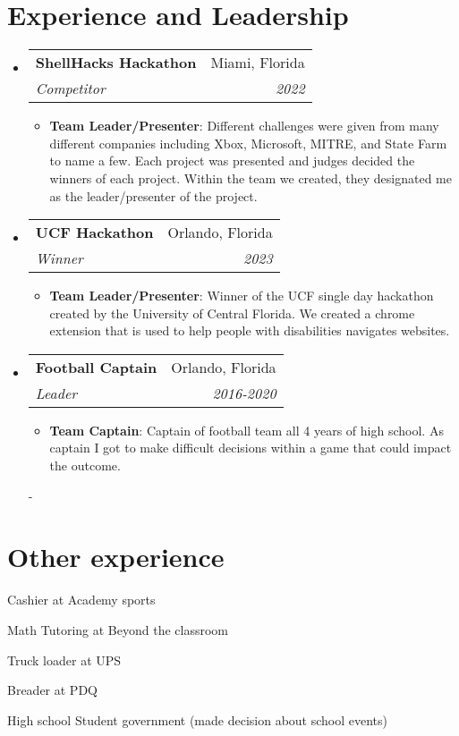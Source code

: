 \documentclass[a4paper,20pt]{article}
\makeatletter
\newcommand{\resumeItem}[2]{
  \item\normalsize{
    \textbf{#1}{: #2 \vspace{1pt}}
  }
}
\newcommand{\resumeSubheading}[4]{
  \vspace{-1pt}\item
    \begin{tabular*}{.97\textwidth}{l@{\extracolsep{\fill}}r}
      \large\textbf{#1} & #2 \\
      \textit{#3} & \textit{#4} \\
    \end{tabular*}\vspace{-5pt}
}
\newcommand{\resumeSubHeadingListStart}{\begin{itemize}[leftmargin=*]}
\newcommand{\resumeSubHeadingListEnd}{\end{itemize}}
\newcommand{\resumeItemListStart}{\begin{itemize}}
\newcommand{\resumeItemListEnd}{\end{itemize}\vspace{-5pt}}
\makeatother
\begin{document}
    \section{Experience and Leadership}
        \resumeSubHeadingListStart
            \resumeSubheading{ShellHacks Hackathon}{Miami, Florida}{Competitor}{2022}
                \resumeItemListStart
                    \resumeItem{Team Leader/Presenter}{Different challenges were given from many different companies including Xbox, Microsoft, MITRE, and State Farm to name a few. Each project was presented and judges decided the winners of each project. Within the team we created, they designated me as the leader/presenter of the project.}
                \resumeItemListEnd
                 \resumeSubheading{UCF Hackathon}{Orlando, Florida}{Winner}{2023}
                \resumeItemListStart
                    \resumeItem{Team Leader/Presenter}{Winner of the UCF single day hackathon created by the University of Central Florida. We created a chrome extension that is used to help people with disabilities navigates websites. }
                \resumeItemListEnd
                \resumeSubheading{Football Captain}{Orlando, Florida}{Leader}{2016-2020}
                \resumeItemListStart
                    \resumeItem{Team Captain}{Captain of football team all 4 years of high school. As captain I got to make difficult decisions within a game that could impact the outcome.  }
                \resumeItemListEnd
                    
                    -
          \resumeSubHeadingListEnd
    
    
    
    \section{Other experience}
        \begin{description}[font=$\bullet$]
            \item {Cashier at Academy sports}
            \item {Math Tutoring at Beyond the classroom}
            \item {Truck loader at UPS}
            \item {Breader at PDQ}
            \item {High school Student government (made decision about school events)}
            
        \end{description}
        
        
\end{document}
